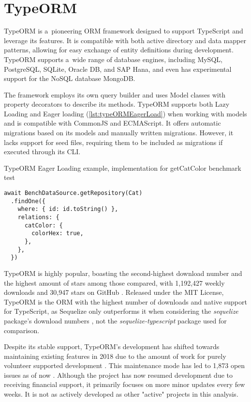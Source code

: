\section{TypeORM}

TypeORM is a~pioneering ORM framework designed to support TypeScript and
leverage its features. It is compatible with both active directory and data
mapper patterns, allowing for easy exchange of entity definitions during
development. TypeORM supports a~wide range of database engines, including MySQL,
PostgreSQL, SQLite, Oracle DB, and SAP Hana, and even has experimental support
for the NoSQL database MongoDB.

The framework employs its own query builder and uses Model classes with property
decorators to describe its methods. TypeORM supports both Lazy Loading and Eager
loading (\autoref{lst:typeORMEagerLoad}) when working with models and is compatible
with CommonJS and ECMAScript. It offers automatic migrations based on its models
and manually written migrations. However, it lacks support for seed files,
requiring them to be included as migrations if executed through its CLI.

\begin{listing}[h]
  \caption{TypeORM Eager Loading example, implementation for getCatColor benchmark test}
  \label{lst:typeORMEagerLoad}
  \begin{verbatim}
await BenchDataSource.getRepository(Cat)
  .findOne({
    where: { id: id.toString() },
    relations: {
      catColor: {
        colorHex: true,
      },
    },
  })
  \end{verbatim}
\end{listing}

TypeORM is highly popular, boasting the second-highest download number and the
highest amount of stars among those compared, with 1,192,427 weekly downloads
\cite{typeORMNpm} and 30,947 stars on GitHub \cite{typeORMGitHub}. Released
under the MIT License, TypeORM is the ORM with the highest number of downloads
and native support for TypeScript, as Sequelize only outperforms it when
considering the \textit{sequelize} package's download numbers
\cite{sequelizeNpm}, not the \textit{sequelize-typescript} package
\cite{sequelizeTypescriptNpm} used for comparison.

Despite its stable support, TypeORM's development has shifted towards
maintaining existing features in 2018 due to the amount of work for purely
volunteer supported development \cite{typeORMGitHubFuture}. This maintenance
mode has led to 1,873 open issues as of now \cite{typeORMGitHub}. Although the
project has now resumed development due to receiving financial support, it
primarily focuses on more minor updates every few weeks. It is not as actively
developed as other "active" projects in this analysis.

